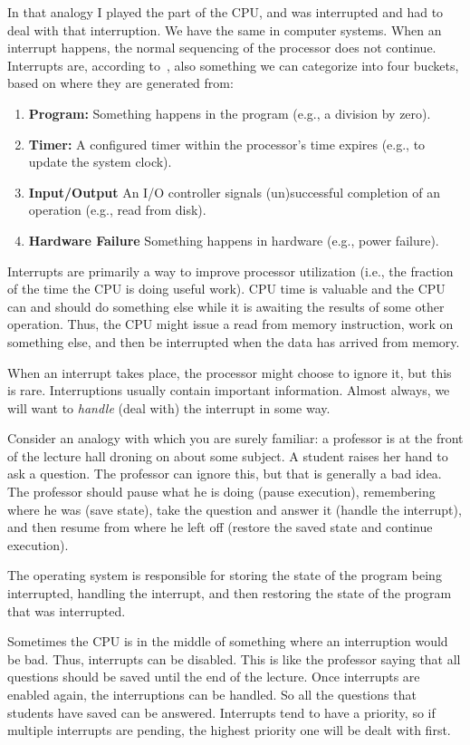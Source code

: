 In that analogy I played the part of the CPU, and was interrupted and had to deal with that interruption. We have the same in computer systems. When an interrupt happens, the normal sequencing of the processor does not continue. Interrupts are, according to~\cite{osi}, also something we can categorize into four buckets, based on where they are generated from:

\begin{enumerate}
	\item \textbf{Program:} Something happens in the program (e.g., a division by zero).
	\item \textbf{Timer:} A configured timer within the processor's time expires (e.g., to update the system clock).
	\item \textbf{Input/Output} An I/O controller signals (un)successful completion of an operation (e.g., read from disk).
	\item \textbf{Hardware Failure} Something happens in hardware (e.g., power failure).
\end{enumerate}

Interrupts are primarily a way to improve processor utilization (i.e., the fraction of the time the CPU is doing useful work). CPU time is valuable and the CPU can and should do something else while it is awaiting the results of some other operation. Thus, the CPU might issue a read from memory instruction, work on something else, and then be interrupted when the data has arrived from memory.

When an interrupt takes place, the processor might choose to ignore it, but this is rare. Interruptions usually contain important information. Almost always, we will want to \textit{handle} (deal with) the interrupt in some way.

Consider an analogy with which you are surely familiar: a professor is at the front of the lecture hall droning on about some subject. A student raises her hand to ask a question. The professor can ignore this, but that is generally a bad idea. The professor should pause what he is doing (pause execution), remembering where he was (save state), take the question and answer it (handle the interrupt), and then resume from where he left off (restore the saved state and continue execution).

The operating system is responsible for storing the state of the program being interrupted, handling the interrupt, and then restoring the state of the program that was interrupted.

Sometimes the CPU is in the middle of something where an interruption would be bad. Thus, interrupts can be disabled. This is like the professor saying that all questions should be saved until the end of the lecture. Once interrupts are enabled again, the interruptions can be handled. So all the questions that students have saved can be answered. Interrupts tend to have a priority, so if multiple interrupts are pending, the highest priority one will be dealt with first.

